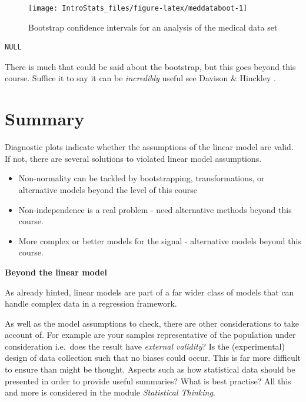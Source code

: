 \documentclass[
  oneside]{krantz}
\begin{document}
\begin{figure}

{\centering \texttt{[image: IntroStats\_files/figure-latex/meddataboot-1]} 

}

\caption{Bootstrap confidence intervals for an analysis of the medical data set}\label{fig:meddataboot}
\end{figure}

\begin{verbatim}
NULL
\end{verbatim}

There is much that could be said about the bootstrap, but this goes beyond this course. Suffice it to say it can be \emph{incredibly} useful see Davison \& Hinckley \citeyearpar{Davison1997}.

\hypertarget{summary-1}{%
\section{Summary}\label{summary-1}}

Diagnostic plots indicate whether the assumptions of the linear model are valid. If not, there are several solutions to violated linear model assumptions.

\begin{itemize}
\item
  Non-normality can be tackled by bootstrapping, transformations, or alternative models beyond the level of this course
\item
  Non-independence is a real problem - need alternative methods beyond this course.
\item
  More complex or better models for the signal - alternative models beyond this course.
\end{itemize}

\textbf{Beyond the linear model}

As already hinted, linear models are part of a far wider class of models that can handle complex data in a regression framework.

As well as the model assumptions to check, there are other considerations to take account of. For example are your samples representative of the population under consideration i.e.~does the result have \emph{external validity}? Is the (experimental) design of data collection such that no biases could occur. This is far more difficult to ensure than might be thought. Aspects such as how statistical data should be presented in order to provide useful summaries? What is best practise? All this and more is considered in the module \emph{Statistical Thinking}.
\end{document}
